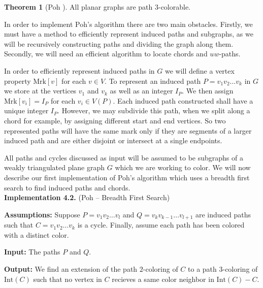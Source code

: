 \documentclass[letterpaper, 12pt]{amsart}
\theoremstyle{definition}
\theoremstyle{definition}
\theoremstyle{thm}
\newtheorem{theorem}{Theorem}[section]
\theoremstyle{definition}
\begin{document}
\begin{theorem}[Poh \cite{poh}]
All planar graphs are path $3$-colorable.
\end{theorem}

In order to implement Poh's algorithm there are two main obstacles. Firstly, we
must have a method to efficiently represent induced paths and subgraphs, as we
will be recursively constructing paths and dividing the graph along them.
Secondly, we will need an efficient algorithm to locate chords and $uw$-paths.

In order to efficiently represent induced paths in $G$ we will define a vertex
property $\text{Mrk}[v]$ for each $v\in V$. To represent an
induced path $P=v_1v_2\ldots v_k$ in $G$ we store at the vertices $v_1$ and
$v_k$ as well as an integer $I_P$. We then assign $\text{Mrk}[v_i]=I_P$ for
each $v_i\in V(P)$. Each induced path constructed shall have a unique integer
$I_P$. However, we may subdivide this path, when we split along a chord for
example, by assigning different start and end vertices. So two represented paths
will have the same mark only if they are segments of a larger induced path and
are either disjoint or intersect at a single endpoints.

All paths and cycles discussed as input will be assumed to be subgraphs of a
weakly triangulated plane graph $G$ which we are working to color. We will now
describe our first implementation of Poh's algorithm which uses a breadth first
search to find induced paths and chords.\\

\noindent\textbf{Implementation 4.2.} (Poh -- Breadth First Search)

\noindent\textbf{Assumptions:} Suppose $P=v_1v_2\ldots v_l$ and
$Q=v_kv_{k-1}\ldots v_{l+1}$ are induced
paths such that $C=v_1v_2\ldots v_k$ is a cycle. Finally, assume each
path has been colored with a distinct color.

\noindent\textbf{Input:} The paths $P$ and $Q$.

\noindent\textbf{Output:} We find an extension of the path $2$-coloring of $C$ to
a path $3$-coloring of $\text{Int}(C)$ such that
no vertex in $C$ recieves a same color neighbor in $\text{Int}(C)-C$.
\end{document}
